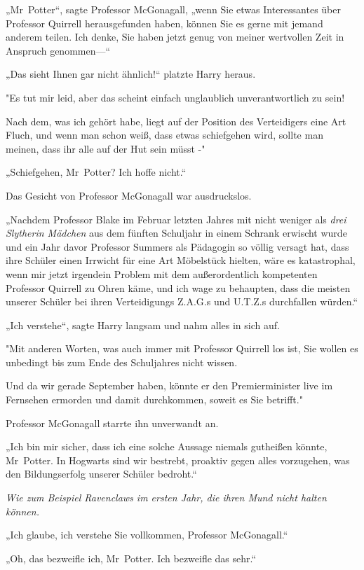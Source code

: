 {„Mr~Potter“, sagte Professor McGonagall, „wenn Sie etwas Interessantes über Professor Quirrell herausgefunden haben, können Sie es gerne mit jemand anderem teilen. Ich denke, Sie haben jetzt genug von meiner wertvollen Zeit in Anspruch genommen—“

„Das sieht Ihnen gar nicht ähnlich!“ platzte Harry heraus.

"Es tut mir leid, aber das scheint einfach unglaublich unverantwortlich zu sein!

Nach dem, was ich gehört habe, liegt auf der Position des Verteidigers eine Art Fluch, und wenn man schon weiß, dass etwas schiefgehen wird, sollte man meinen, dass ihr alle auf der Hut sein müsst -"

„Schiefgehen, Mr~Potter? Ich hoffe nicht.“

Das Gesicht von Professor McGonagall war ausdruckslos.

„Nachdem Professor Blake im Februar letzten Jahres mit nicht weniger als \emph{drei Slytherin Mädchen} aus dem fünften Schuljahr in einem Schrank erwischt wurde und ein Jahr davor Professor Summers als Pädagogin so völlig versagt hat, dass ihre Schüler einen Irrwicht für eine Art Möbelstück hielten, wäre es katastrophal, wenn mir jetzt irgendein Problem mit dem außerordentlich kompetenten Professor Quirrell zu Ohren käme, und ich wage zu behaupten, dass die meisten unserer Schüler bei ihren Verteidigungs Z.A.G.s und U.T.Z.s durchfallen würden.“

„Ich verstehe“, sagte Harry langsam und nahm alles in sich auf.

"Mit anderen Worten, was auch immer mit Professor Quirrell los ist, Sie wollen es unbedingt bis zum Ende des Schuljahres nicht wissen.

Und da wir gerade September haben, könnte er den Premierminister live im Fernsehen ermorden und damit durchkommen, soweit es Sie betrifft."

Professor McGonagall starrte ihn unverwandt an.

„Ich bin mir sicher, dass ich eine solche Aussage niemals gutheißen könnte, Mr~Potter. In Hogwarts sind wir bestrebt, proaktiv gegen alles vorzugehen, was den Bildungserfolg unserer Schüler bedroht.“

\emph{Wie zum Beispiel Ravenclaws im ersten Jahr, die ihren Mund nicht halten können.}

„Ich glaube, ich verstehe Sie vollkommen, Professor McGonagall.“

„Oh, das bezweifle ich, Mr~Potter. Ich bezweifle das sehr.“

}
